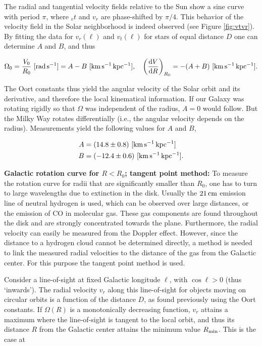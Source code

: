 \documentclass[a4paper,10pt]{article}
\begin{document}
{\noindent}The radial and tangential velocity fields relative to the Sun show a sine curve with period $\pi$, where $_vt$ and $v_r$ are phase-shifted by $\pi/4$. This behavior of the velocity field in the Solar neighborhood is indeed observed (see Figure \ref{fig:vtvr}). By fitting the data for $v_r(\ell)$ and $v_t(\ell)$ for stars of equal distance $D$ one can determine $A$ and $B$, and thus

\begin{align*}
    \Omega_0 = \frac{V_0}{R_0} ~ [{\rm rad\,s^{-1}}] = A-B ~ [{\rm km\,s^{-1}\,kpc^{-1}}], ~~~ \left(\frac{{\rm d}V}{{\rm d}R}\right)_{R_0} = -(A+B) ~ [{\rm km\,s^{-1}\,kpc^{-1}}].
\end{align*}

{\noindent}The Oort constants thus yield the angular velocity of the Solar orbit and its derivative, and therefore the local kinematical information. If our Galaxy was rotating rigidly so that $\Omega$ was independent of the radius, $A=0$ would follow. But the Milky Way rotates differentially (i.e., the angular velocity depends on the radius). Measurements yield the following values for $A$ and $B$,

\begin{align*}
    A &= (14.8\pm0.8) ~ [{\rm km\,s^{-1}\,kpc^{-1}}] \\
    B &= (-12.4\pm0.6) ~ [{\rm km\,s^{-1}\,kpc^{-1}}].
\end{align*}

{\noindent}\textbf{Galactic rotation curve for $R<R_0$; tangent point method:} To measure the rotation curve for radii that are significantly smaller than $R_0$, one has to turn to large wavelengths due to extinction in the disk. Usually the $21\,{\rm cm}$ emission line of neutral hydrogen is used, which can be observed over large distances, or the emission of CO in molecular gas. These gas components are found throughout the disk and are strongly concentrated towards the plane. Furthermore, the radial velocity can easily be measured from the Doppler effect. However, since the distance to a hydrogen cloud cannot be determined directly, a method is needed to link the measured radial velocities to the distance of the gas from the Galactic center. For this purpose the tangent point method is used.

{\noindent}Consider a line-of-sight at fixed Galactic longitude $\ell$, with $\cos\ell>0$ (thus `inwards'). The radial velocity $v_r$ along this line-of-sight for objects moving on circular orbits is a function of the distance $D$, as found previously using the Oort constants. If $\Omega(R)$ is a monotonically decreasing function, $v_r$ attains a maximum where the line-of-sight is tangent to the local orbit, and thus its distance $R$ from the Galactic center attains the minimum value $R_{\rm min}$. This is the case at
\end{document}
